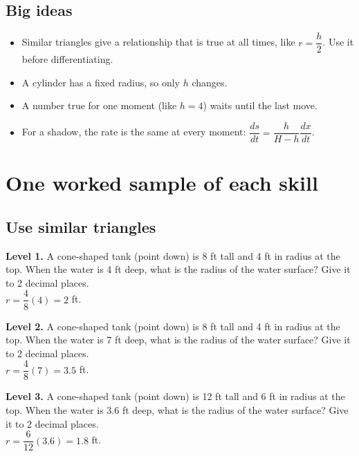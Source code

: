 \documentclass[11pt]{article}
\begin{document}
\subsection*{Big ideas}\begin{itemize}\item Similar triangles give a relationship that is true at all times, like $r=\dfrac h2$. Use it before differentiating.
\item A cylinder has a fixed radius, so only $h$ changes.
\item A number true for one moment (like $h=4$) waits until the last move.
\item For a shadow, the rate is the same at every moment: $\dfrac{ds}{dt}=\dfrac{h}{H-h}\dfrac{dx}{dt}$.\end{itemize}
\section*{One worked sample of each skill}
\subsection*{Use similar triangles}
\noindent\textbf{Level 1.} A cone-shaped tank (point down) is 8 ft tall and 4 ft in radius at the top. When the water is 4 ft deep, what is the radius of the water surface? Give it to 2 decimal places.\\  \quad $r=\dfrac{4}{8}(4)=2$ ft.\par\medskip
\noindent\textbf{Level 2.} A cone-shaped tank (point down) is 8 ft tall and 4 ft in radius at the top. When the water is 7 ft deep, what is the radius of the water surface? Give it to 2 decimal places.\\  \quad $r=\dfrac{4}{8}(7)=3.5$ ft.\par\medskip
\noindent\textbf{Level 3.} A cone-shaped tank (point down) is 12 ft tall and 6 ft in radius at the top. When the water is 3.6 ft deep, what is the radius of the water surface? Give it to 2 decimal places.\\  \quad $r=\dfrac{6}{12}(3.6)=1.8$ ft.\par\medskip
\end{document}
